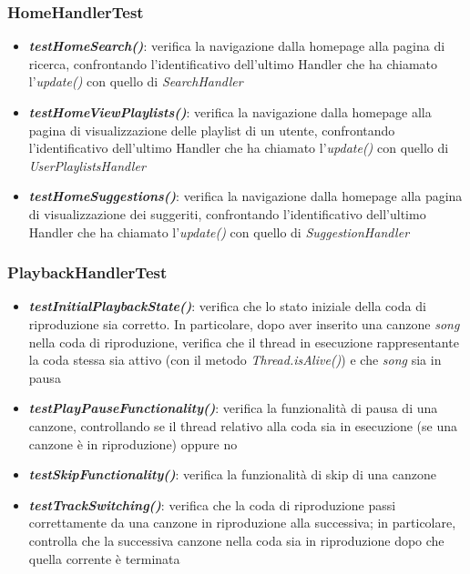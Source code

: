 \documentclass{article}
\begin{document}
  \subsubsection{HomeHandlerTest}

  \begin{itemize}

    \item \textbf{\textit{testHomeSearch()}}: verifica la navigazione dalla homepage alla pagina di ricerca, confrontando l'identificativo dell'ultimo Handler che ha chiamato l'\textit{update()} con quello di \textit{SearchHandler}

    \item \textbf{\textit{testHomeViewPlaylists()}}: verifica la navigazione dalla homepage alla pagina di visualizzazione delle playlist di un utente, confrontando l'identificativo dell'ultimo Handler che ha chiamato l'\textit{update()} con quello di \textit{UserPlaylistsHandler}

    \item \textbf{\textit{testHomeSuggestions()}}: verifica la navigazione dalla homepage alla pagina di visualizzazione dei suggeriti, confrontando l'identificativo dell'ultimo Handler che ha chiamato l'\textit{update()} con quello di \textit{SuggestionHandler}

  \end{itemize}


  \subsubsection{PlaybackHandlerTest}
  \begin{itemize}

    \item \textbf{\textit{testInitialPlaybackState()}}: verifica che lo stato iniziale della coda di riproduzione sia corretto. In particolare,
    dopo aver inserito una canzone \textit{song} nella coda di riproduzione, verifica che il thread in esecuzione rappresentante la coda stessa sia attivo (con il metodo \textit{Thread.isAlive()}) e che \textit{song} sia in pausa

    \item \textbf{\textit{testPlayPauseFunctionality()}}: verifica la funzionalità di pausa di una canzone, controllando se il thread relativo alla coda sia in esecuzione (se una canzone è in riproduzione) oppure no

    \item \textbf{\textit{testSkipFunctionality()}}: verifica la funzionalità di skip di una canzone

    \item \textbf{\textit{testTrackSwitching()}}: verifica che la coda di riproduzione passi correttamente da una canzone in riproduzione alla successiva; in particolare, controlla che la successiva canzone nella coda sia in riproduzione dopo che quella corrente è terminata

  \end{itemize}
\end{document}
